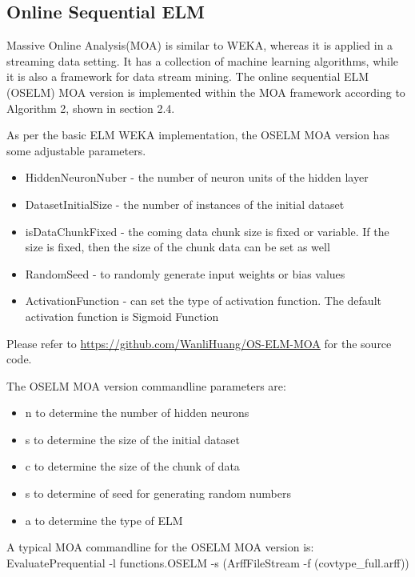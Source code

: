 \documentclass[a4paper, 14pt]{extarticle}
\begin{document}
\subsection{Online Sequential ELM}
\par Massive Online Analysis(MOA) is similar to WEKA, whereas it is applied in a streaming data setting. It has a collection of machine learning algorithms, while it is also a framework for data stream mining\cite{MOA}. The online sequential ELM (OSELM) MOA version is implemented within the MOA framework according to Algorithm 2, shown in section 2.4. 
\par As per the basic ELM WEKA implementation, the OSELM MOA version has some adjustable parameters. 
\begin{itemize}
    \item HiddenNeuronNuber - the number of neuron units of the hidden layer
    \item DatasetInitialSize - the number of instances of the initial dataset
    \item isDataChunkFixed - the coming data chunk size is fixed or variable. If the size is fixed, then the size of the chunk data can be set as well
    \item RandomSeed - to randomly generate input weights or bias values
    \item ActivationFunction - can set the type of activation function. The default activation function is Sigmoid Function
\end{itemize}
Please refer to \url{https://github.com/WanliHuang/OS-ELM-MOA} for the source code.

\par The OSELM MOA version commandline parameters are:
\begin{itemize}
    \item n   to determine the number of hidden neurons
    \item s   to determine the size of the initial dataset
    \item c   to determine the size of the chunk of data
    \item s   to determine of seed for generating random numbers
    \item a   to determine the type of ELM
\end{itemize}
A typical MOA commandline for the OSELM MOA version is: \newline\newline
EvaluatePrequential -l functions.OSELM -s (ArffFileStream -f (covtype\_full.arff))
\end{document}
